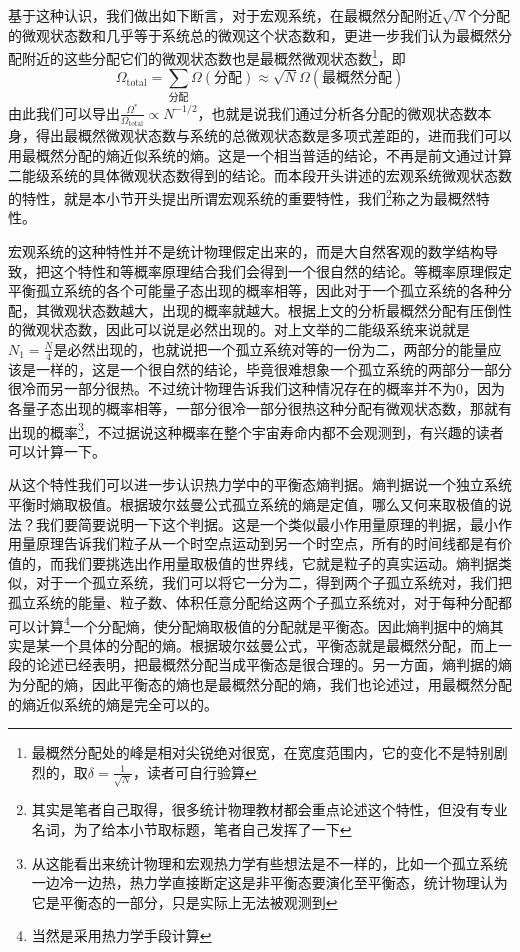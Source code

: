 \documentclass[../../main.tex]{subfiles}
\begin{document}
基于这种认识，我们做出如下断言，对于宏观系统，在最概然分配附近\(\sqrt{N}\)个分配的微观状态数和几乎等于系统总的微观这个状态数和，更进一步我们认为最概然分配附近的这些分配它们的微观状态数也是最概然微观状态数\footnote{最概然分配处的峰是相对尖锐绝对很宽，在宽度范围内，它的变化不是特别剧烈的，取\(\delta=\frac{1}{\sqrt{N}}\)，读者可自行验算}，即
\begin{equation}
    \boxed{\Omega_{\text{total}}=\sum_{\text{分配}}\Omega(\text{分配})\approx \sqrt{N}\Omega(\text{最概然分配})}
\end{equation}
由此我们可以导出\(\frac{\Omega^*}{\Omega_{\text{total}}}\propto N^{-1/2}\)，也就是说我们通过分析各分配的微观状态数本身，得出最概然微观状态数与系统的总微观状态数是多项式差距的，进而我们可以用最概然分配的熵近似系统的熵。这是一个相当普适的结论，不再是前文通过计算二能级系统的具体微观状态数得到的结论。而本段开头讲述的宏观系统微观状态数的特性，就是本小节开头提出所谓宏观系统的重要特性，我们\footnote{其实是笔者自己取得，很多统计物理教材都会重点论述这个特性，但没有专业名词，为了给本小节取标题，笔者自己发挥了一下}称之为最概然特性。

宏观系统的这种特性并不是统计物理假定出来的，而是大自然客观的数学结构导致，把这个特性和等概率原理结合我们会得到一个很自然的结论。等概率原理假定平衡孤立系统的各个可能量子态出现的概率相等，因此对于一个孤立系统的各种分配，其微观状态数越大，出现的概率就越大。根据上文的分析最概然分配有压倒性的微观状态数，因此可以说是必然出现的。对上文举的二能级系统来说就是\(N_1=\frac{N}{4}\)是必然出现的，也就说把一个孤立系统对等的一份为二，两部分的能量应该是一样的，这是一个很自然的结论，毕竟很难想象一个孤立系统的两部分一部分很冷而另一部分很热。不过统计物理告诉我们这种情况存在的概率并不为0，因为各量子态出现的概率相等，一部分很冷一部分很热这种分配有微观状态数，那就有出现的概率\footnote{从这能看出来统计物理和宏观热力学有些想法是不一样的，比如一个孤立系统一边冷一边热，热力学直接断定这是非平衡态要演化至平衡态，统计物理认为它是平衡态的一部分，只是实际上无法被观测到}，不过据说这种概率在整个宇宙寿命内都不会观测到，有兴趣的读者可以计算一下。

从这个特性我们可以进一步认识热力学中的平衡态熵判据。熵判据说一个独立系统平衡时熵取极值。根据玻尔兹曼公式孤立系统的熵是定值，哪么又何来取极值的说法？我们要简要说明一下这个判据。这是一个类似最小作用量原理的判据，最小作用量原理告诉我们粒子从一个时空点运动到另一个时空点，所有的时间线都是有价值的，而我们要挑选出作用量取极值的世界线，它就是粒子的真实运动。熵判据类似，对于一个孤立系统，我们可以将它一分为二，得到两个子孤立系统对，我们把孤立系统的能量、粒子数、体积任意分配给这两个子孤立系统对，对于每种分配都可以计算\footnote{当然是采用热力学手段计算}一个分配熵，使分配熵取极值的分配就是平衡态。因此熵判据中的熵其实是某一个具体的分配的熵。根据玻尔兹曼公式，平衡态就是最概然分配，而上一段的论述已经表明，把最概然分配当成平衡态是很合理的。另一方面，熵判据的熵为分配的熵，因此平衡态的熵也是最概然分配的熵，我们也论述过，用最概然分配的熵近似系统的熵是完全可以的。
\end{document}
